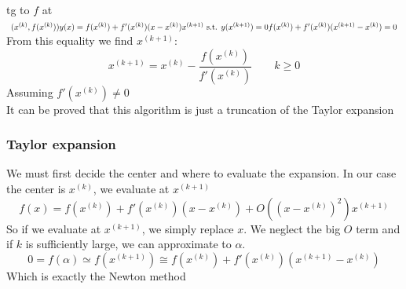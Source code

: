 \begin{figure}[!ht]
    \begin{minipage}{\linewidth}
        \centering
    \end{minipage}
\end{figure}

tg to $f$ at $(x^{(k)},f(x^{(k)}))\\
y(x)=f(x^{(k)})+f'(x^{(k)})(x-x^{(k)})\\
x^{(k+1)}\text{ s.t. }y(x^{(k+1)})=0\\
f(x^{(k)})+f'(x^{(k)})(x^{(k+1)}-x^{(k)})=0
$\\
From this equality we find $x^{(k+1)}$:\\
$$x^{(k+1)}=x^{(k)}-\frac{f(x^{(k)})}{f'(x^{(k)})}\qquad k\geq 0$$
Assuming $f'(x^{(k)})\neq 0$\\
It can be proved that this algorithm is just a truncation of the Taylor expansion
\subsubsection{Taylor expansion}
We must first decide the center and where to evaluate the expansion. In our case the center is $x^{(k)}$, we evaluate at $x^{(k+1)}$
$$f(x)=f(x^{(k)})+f'(x^{(k)})(x-x^{(k)})+O\left((x-x^{(k)})^2\right)x^{(k+1)}$$
So if we evaluate at $x^{(k+1)}$, we simply replace $x$. We neglect the big $O$ term and if $k$ is sufficiently large, we can approximate to $\alpha$.
$$0=f(\alpha)\simeq f(x^{(k+1)})\cong f(x^{(k)})+f'(x^{(k)})(x^{(k+1)}-x^{(k)})$$
Which is exactly the Newton method

